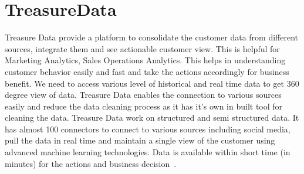 \section{TreasureData}

Treasure Data provide a platform to consolidate the customer data from
different sources, integrate them and see actionable customer view. 
This is helpful for Marketing Analytics, Sales Operations Analytics. 
This helps in understanding customer behavior easily 
and fast and take the actions accordingly for business benefit. We 
need to access various level of historical and real time data to get 
360 degree view of data. Treasure Data enables the connection to 
various sources easily and reduce the data 
cleaning process as it has it's own in built 
tool for cleaning the data. Treasure Data work on structured and semi 
structured data. It has almost 100 connectors to connect to various 
sources including social media, pull the data in real time and 
maintain a single view of the customer using advanced machine learning
technologies. Data is available within short time (in minutes) for the
actions and business decision~\cite{hid-sp18-511-treasuredata}.
